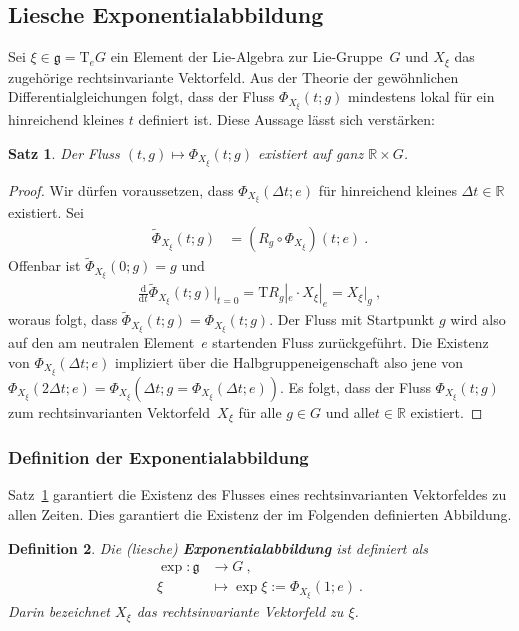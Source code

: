 \documentclass[10pt,a4paper]{article}
\theoremstyle{mytheorem}
\newtheorem{theorem}{Satz}[section]
\theoremstyle{mydefinition}
\newtheorem{definition}[theorem]{Definition}
\newcommand{\mydef}[1]{\textbf{\textit{#1}}}
\newcommand{\dt}{\mathrm{d}}
\newcommand{\Tt}{\mathrm{T}}
\begin{document}
\subsection{Liesche Exponentialabbildung}

Sei $\xi\in\mathfrak{g}=\Tt_eG$ ein Element der Lie-Algebra zur Lie-Gruppe~$G$ und $X_\xi$ das zugehörige rechtsinvariante Vektorfeld.
Aus der Theorie der gewöhnlichen Differentialgleichungen folgt, dass der Fluss $\Phi_{X_\xi}(t;g)$ mindestens lokal für ein hinreichend kleines $t$ definiert ist.
Diese Aussage lässt sich verstärken:
\begin{theorem}
\label{th:PhiGlobal}
Der Fluss $(t, g)\mapsto\Phi_{X_\xi}(t;g)$ existiert auf ganz $\mathbb{R}\times G$.
\end{theorem}
\begin{proof}
Wir dürfen voraussetzen, dass $\Phi_{X_\xi}(\Delta t;e)$ für hinreichend kleines $\Delta t\in\mathbb{R}$ existiert.
Sei
\begin{align*}
	\tilde{\Phi}_{X_\xi}(t;g)
	&= (R_g\circ\Phi_{X_\xi})(t;e)
	\ .
\end{align*}
Offenbar ist $\tilde{\Phi}_{X_\xi}(0;g)=g$ und
\begin{align*}
	\frac{\dt}{\dt t}
		\tilde{\Phi}_{X_\xi}(t;g)
	\Big|_{t=0}
	= \Tt R_g|_e \cdot X_\xi|_e
	= X_\xi|_g
	\ ,
\end{align*}
woraus folgt, dass $\tilde{\Phi}_{X_\xi}(t;g)=\Phi_{X_\xi}(t;g)$.
Der Fluss mit Startpunkt $g$ wird also auf den am neutralen Element~$e$ startenden Fluss zurückgeführt.
Die Existenz von $\Phi_{X_\xi}(\Delta t;e)$ impliziert über die Halbgruppeneigenschaft also jene von $\Phi_{X_\xi}(2\Delta t;e)=\Phi_{X_\xi}(\Delta t;g=\Phi_{X_\xi}(\Delta t;e))$.
Es folgt, dass der Fluss $\Phi_{X_\xi}(t;g)$ zum rechtsinvarianten Vektorfeld~$X_\xi$ für alle $g\in G$ und alle$t\in\mathbb{R}$ existiert.
\end{proof}

\subsubsection{Definition der Exponentialabbildung}

Satz~\ref{th:PhiGlobal} garantiert die Existenz des Flusses eines rechtsinvarianten Vektorfeldes zu allen Zeiten.
Dies garantiert die Existenz der im Folgenden definierten Abbildung.
\begin{definition}
Die (liesche) \mydef{Exponentialabbildung} ist definiert als
\begin{align*}
	\exp: 
	\mathfrak{g} &\rightarrow G
	\ ,\nonumber\\
	\xi &\mapsto \exp\xi := \Phi_{X_\xi}(1; e)
	\ .
\end{align*}
Darin bezeichnet $X_\xi$ das rechtsinvariante Vektorfeld zu $\xi$.
\end{definition}
\end{document}
